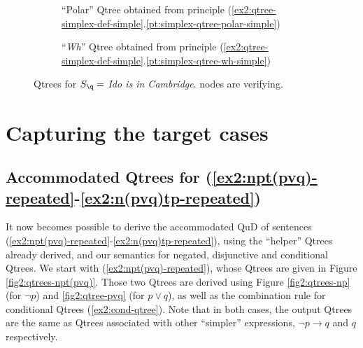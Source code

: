 	\begin{figure}[H]
		\centering
		\begin{subfigure}[b]{.3\linewidth}
			\centering
			\scalebox{1}{
				\begin{forest}
					[CS [\fbox{$\q$}][$\neg \q$]]
				\end{forest}
			}
			\caption{``Polar'' Qtree obtained from principle (\ref{ex2:qtree-simplex-def-simple}.\ref{pt:simplex-qtree-polar-simple})}\label{fig2:qtree-q-polar}
		\end{subfigure}\qquad
		\begin{subfigure}[b]{.3\linewidth}
			\centering
			\scalebox{1}{
				\begin{forest}
					[CS [$\p$][\fbox{$\q$}][$\r$][...]]
				\end{forest}
			}
			\caption{``\textit{Wh}'' Qtree obtained from principle (\ref{ex2:qtree-simplex-def-simple}.\ref{pt:simplex-qtree-wh-simple})}\label{fig2:qtree-q-wh}
		\end{subfigure}
		\caption{Qtrees for $S\protect_{\q}=$ \textit{Ido is in Cambridge}. \setlength{\fboxsep}{1pt} nodes are verifying.}
		\label{fig2:qtrees-q}
	\end{figure}






\section{Capturing the target cases}


\subsection{Accommodated Qtrees for (\ref{ex2:npt(pvq)-repeated}-\ref{ex2:n(pvq)tp-repeated})}
It now becomes possible to derive the accommodated QuD of sentences (\ref{ex2:npt(pvq)-repeated}-\ref{ex2:n(pvq)tp-repeated}), using the ``helper'' Qtrees already derived, and our semantics for negated, disjunctive and conditional Qtrees. We start with (\ref{ex2:npt(pvq)-repeated}), whose Qtrees are given in Figure \ref{fig2:qtrees-npt(pvq)}. Those two Qtrees are derived using Figure \ref{fig2:qtrees-np} (for $\neg p$) and \ref{fig2:qtree-pvq} (for $p\vee q$), as well as the combination rule for conditional Qtrees (\ref{ex2:cond-qtree}). Note that in both cases, the output Qtrees are the same as Qtrees associated with other ``simpler'' expressions, $\neg p \rightarrow q$ and $q$ respectively.

